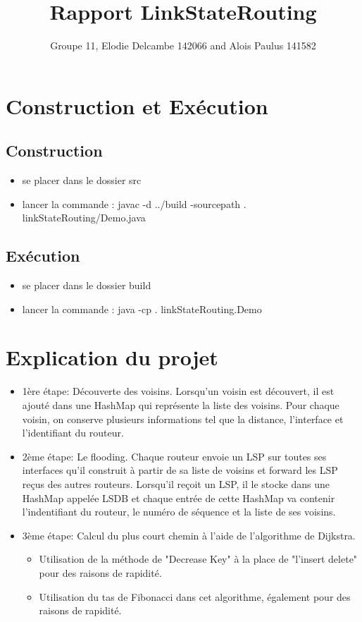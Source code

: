 \documentclass[a4paper, 12pt]{article}
\title{Rapport LinkStateRouting}
\author{Groupe 11, Elodie Delcambe 142066 and Alois Paulus 141582 }
\begin{document}
\maketitle

\tableofcontents

\newpage

\section{Construction et Exécution}
\subsection{Construction}
\begin{itemize}
\item se placer dans le dossier src
\item lancer la commande : javac -d ../build -sourcepath . linkStateRouting/Demo.java
\end{itemize}

\subsection{Exécution}

\begin{itemize}
\item se placer dans le dossier build
\item lancer la commande : java -cp . linkStateRouting.Demo
\end{itemize}

\section{Explication du projet}
\begin{itemize}
\item 1ère étape: Découverte des voisins.
Lorsqu'un voisin est découvert, il est ajouté dans une HashMap qui représente la liste des voisins. Pour chaque voisin, on conserve plusieurs informations tel que la distance, l'interface et l'identifiant du routeur.

\item 2ème étape: Le flooding.
Chaque routeur envoie un LSP sur toutes ses interfaces qu'il construit à partir de sa liste de voisins et forward les LSP reçus des autres routeurs.
Lorsqu'il reçoit un LSP, il le stocke dans une HashMap appelée LSDB et chaque entrée de cette HashMap va contenir l'indentifiant du routeur, le numéro de séquence et la liste de ses voisins.

\item 3ème étape: Calcul du plus court chemin à l'aide de l'algorithme de Dijkstra.
\begin{itemize}
\item Utilisation de la méthode de "Decrease Key" à la place de "l'insert delete" pour des raisons de rapidité. 
\item Utilisation du tas de Fibonacci dans cet algorithme, également pour des raisons de rapidité.
\end{itemize}
\end{itemize}
\newpage
\end{document}
